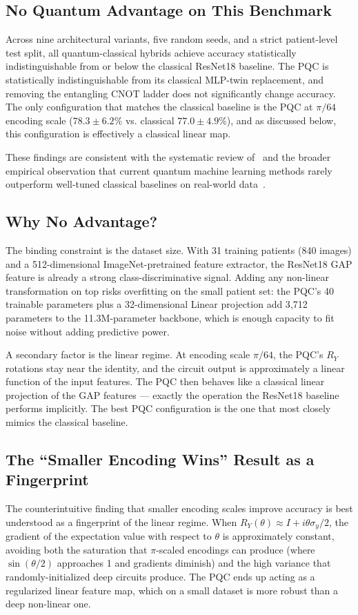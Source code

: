 \documentclass[conference]{IEEEtran}
\begin{document}
\subsection{No Quantum Advantage on This Benchmark}
Across nine architectural variants, five random seeds, and a strict patient-level test split, all quantum-classical hybrids achieve accuracy statistically indistinguishable from or below the classical ResNet18 baseline. The PQC is statistically indistinguishable from its classical MLP-twin replacement, and removing the entangling CNOT ladder does not significantly change accuracy. The only configuration that matches the classical baseline is the PQC at $\pi/64$ encoding scale ($78.3 \pm 6.2\%$ vs. classical $77.0 \pm 4.9\%$), and as discussed below, this configuration is effectively a classical linear map.

These findings are consistent with the systematic review of~\cite{peral2024systematic} and the broader empirical observation that current quantum machine learning methods rarely outperform well-tuned classical baselines on real-world data~\cite{abbas2021power, npj_systematic2025}.

\subsection{Why No Advantage?}
The binding constraint is the dataset size. With 31 training patients (840 images) and a 512-dimensional ImageNet-pretrained feature extractor, the ResNet18 GAP feature is already a strong class-discriminative signal. Adding any non-linear transformation on top risks overfitting on the small patient set: the PQC's 40 trainable parameters plus a 32-dimensional Linear projection add 3{,}712 parameters to the 11.3M-parameter backbone, which is enough capacity to fit noise without adding predictive power.

A secondary factor is the linear regime. At encoding scale $\pi/64$, the PQC's $R_Y$ rotations stay near the identity, and the circuit output is approximately a linear function of the input features. The PQC then behaves like a classical linear projection of the GAP features — exactly the operation the ResNet18 baseline performs implicitly. The best PQC configuration is the one that most closely mimics the classical baseline.

\subsection{The ``Smaller Encoding Wins'' Result as a Fingerprint}
The counterintuitive finding that smaller encoding scales improve accuracy is best understood as a fingerprint of the linear regime. When $R_Y(\theta) \approx I + i \theta \sigma_y / 2$, the gradient of the expectation value with respect to $\theta$ is approximately constant, avoiding both the saturation that $\pi$-scaled encodings can produce (where $\sin(\theta/2)$ approaches 1 and gradients diminish) and the high variance that randomly-initialized deep circuits produce. The PQC ends up acting as a regularized linear feature map, which on a small dataset is more robust than a deep non-linear one.
\end{document}
